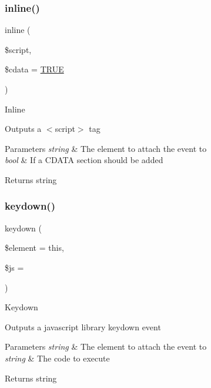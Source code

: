 \subsubsection{\texorpdfstring{inline()}{inline()}}
{\footnotesize\ttfamily inline (\begin{DoxyParamCaption}\item[{}]{\$script,  }\item[{}]{\$cdata = {\ttfamily \mbox{\hyperlink{constants_8php_ae04a3efe6aa42044f803ee90c2277846}{T\+R\+UE}}} }\end{DoxyParamCaption})}

Inline

Outputs a $<$script$>$ tag


\begin{DoxyParams}{Parameters}
{\em string} & The element to attach the event to \\
\hline
{\em bool} & If a C\+D\+A\+TA section should be added \\
\hline
\end{DoxyParams}
\begin{DoxyReturn}{Returns}
string 
\end{DoxyReturn}
\mbox{\label{class_c_i___javascript_ad707956fd5a0588de445d786396b33ec}} 
\subsubsection{\texorpdfstring{keydown()}{keydown()}}
{\footnotesize\ttfamily keydown (\begin{DoxyParamCaption}\item[{}]{\$element = {\ttfamily \textquotesingle{}this\textquotesingle{}},  }\item[{}]{\$js = {\ttfamily \textquotesingle{}\textquotesingle{}} }\end{DoxyParamCaption})}

Keydown

Outputs a javascript library keydown event


\begin{DoxyParams}{Parameters}
{\em string} & The element to attach the event to \\
\hline
{\em string} & The code to execute \\
\hline
\end{DoxyParams}
\begin{DoxyReturn}{Returns}
string 
\end{DoxyReturn}
\mbox{\label{class_c_i___javascript_a8c6e3a3b521c059cfd6799b3dc73d0d6}} 
